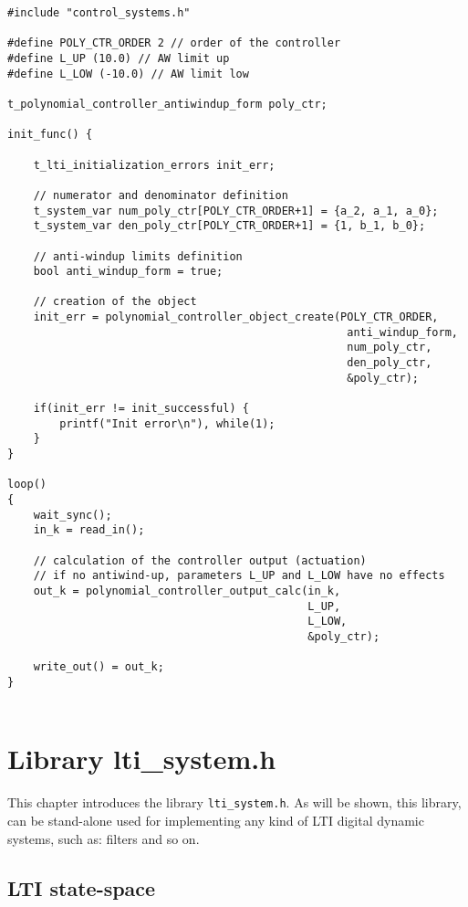 \documentclass[12pt]{Template_}
\begin{document}
\begin{verbatim}
#include "control_systems.h"

#define POLY_CTR_ORDER 2 // order of the controller
#define L_UP (10.0) // AW limit up
#define L_LOW (-10.0) // AW limit low

t_polynomial_controller_antiwindup_form poly_ctr;
	
init_func() {
    
    t_lti_initialization_errors init_err;
	
    // numerator and denominator definition
    t_system_var num_poly_ctr[POLY_CTR_ORDER+1] = {a_2, a_1, a_0};
    t_system_var den_poly_ctr[POLY_CTR_ORDER+1] = {1, b_1, b_0};
	
    // anti-windup limits definition
    bool anti_windup_form = true;
	
    // creation of the object
    init_err = polynomial_controller_object_create(POLY_CTR_ORDER,
                                                    anti_windup_form,	
                                                    num_poly_ctr,
                                                    den_poly_ctr,
                                                    &poly_ctr);

    if(init_err != init_successful) {
        printf("Init error\n"), while(1);
    }
}

loop() 
{
    wait_sync();
    in_k = read_in();
	
    // calculation of the controller output (actuation)
    // if no antiwind-up, parameters L_UP and L_LOW have no effects
    out_k = polynomial_controller_output_calc(in_k, 
                                              L_UP,
                                              L_LOW, 
                                              &poly_ctr);
															
    write_out() = out_k;
}
	
\end{verbatim}

\newpage

\chapter{Library lti\_system.h}
This chapter introduces the library \verb~lti_system.h~. 
As will be shown, this library, can be stand-alone used for implementing any kind of LTI digital dynamic systems, such as: filters and so on.
 
\section{LTI state-space}
\end{document}

